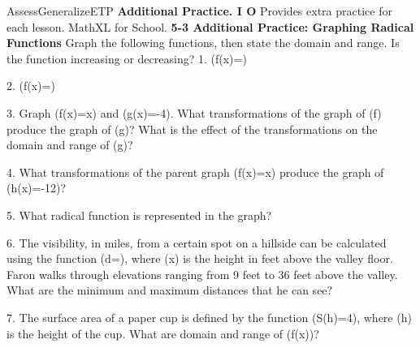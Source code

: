 \documentclass{article}
\newenvironment{te-addendum}[2]{}{}     %
\newcommand{\answer}[1]{}               %
\newcommand{\placeholder}[2]{}          %
\newcommand{\te}[1]{}                   %
\begin{document}
\begin{te-addendum}{Assess}{GeneralizeETP}
\textbf{Additional Practice. I O}
Provides extra practice for each lesson. MathXL for School.
\textbf{5-3 Additional Practice: Graphing Radical Functions}
Graph the following functions, then state the domain and range. Is the function increasing or decreasing?
1. (f(x)=)
\answer{domain: (x\geq3); range: (y\geq0); increasing}
\placeholder{graph}{Magenta square-root curve starts at (3,0), increases to right with arrow. Axes x,y, origin O, x grid spacing 2, y grid spacing 1, x window -8 to 10,y=-3 to 3, labels x=-4,4,8 and y=-2,2.}
2. (f(x)=)
\answer{domain: all real numbers; range: all real numbers; increasing}
\placeholder{graph}{Magenta cube-root curve (\sqrt[3]{x+2}), centered at (-2,0), arrows at both ends. Axes x,y, origin O, grid spacing 2, window -8 to 10 on x, -8 to 10 on y, labels x=4,8 and y=-4,4,8.}
3. Graph (f(x)=\sqrt x) and (g(x)=-4). What transformations of the graph of (f) produce the graph of (g)? What is the effect of the transformations on the domain and range of (g)?
\answer{The graph of (f) is translated 2 units right and 4 units downward, and compressed vertically by a factor of 3. The domain of (f) is (x\geq0) while the domain of (g) is (x\geq2). The range of (f) is (y\geq0) while the range of (g) is (y\geq-4).}
\te{Printed compression factor is 3; the multiplier is (\frac13).}
\placeholder{graph}{Magenta curves f=\sqrt x from (0,0) and g=\frac13\sqrt{x-2}-4 from (2,-4), labeled f,g and with right arrows. Axes x,y, origin O, grid spacing 2, window x=-6 to 10,y=-8 to 8, labels x=-4,4,8 and y=-4,4.}
4. What transformations of the parent graph (f(x)=\sqrt x) produce the graph of (h(x)=-12)?
\answer{The graph of (f) is translated 0.5 to the right and 12 units downward, and stretched vertically by a factor of 3.}
\placeholder{graph}{Black f=\sqrt x and h=\sqrt{9x-4.5}-12 labeled f,h, starting at (0,0) and (0.5,-12), increasing right with arrows. Axes x,y, origin O, x grid 2 and labels -4,4,8; y grid 5 with label -10; window approximately x=-8 to 10,y=-15 to 10.}
5. What radical function is represented in the graph?
\answer{(f(x)=\sqrt{x+2}-6)}
\placeholder{graph}{Black square-root curve begins at (-2,-6), rises right with arrow. Axes x,y, origin O, x grid 2 with labels -4,4,8, y grid 5 with labels -10,10; window x=-8 to 10,y=-15 to 15.}
6. The visibility, in miles, from a certain spot on a hillside can be calculated using the function (d=), where (x) is the height in feet above the valley floor. Faron walks through elevations ranging from 9 feet to 36 feet above the valley. What are the minimum and maximum distances that he can see?
\answer{minimum: 3.67 mi; maximum: 7.35 mi}
7. The surface area of a paper cup is defined by the function (S(h)=4\pi{}), where (h) is the height of the cup. What are domain and range of (f(x))?
\answer{(h>0) and (s(h)>16\pi)}
\te{Printed question uses f(x) after defining S(h); printed answer uses lowercase s(h).}
\end{te-addendum}
\end{document}
